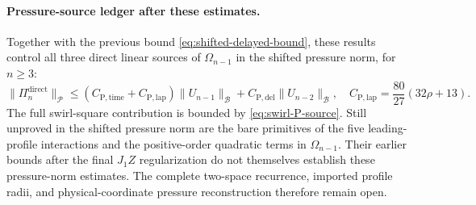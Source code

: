 \paragraph{Pressure-source ledger after these estimates.}
Together with the previous bound
\eqref{eq:shifted-delayed-bound}, these results control
all three direct linear sources of $\Omega_{n-1}$
in the shifted pressure norm, for $n\ge3$:
\begin{equation}\label{eq:direct-pressure-P-bound}
\|\Pi_n^{\mathrm{direct}}\|_{\mathcal P}
\le(C_{\mathrm{P,time}}+C_{\mathrm{P,lap}})
\|U_{n-1}\|_{\mathcal B}
+C_{\mathrm{P,del}}\|U_{n-2}\|_{\mathcal B},
\quad C_{\mathrm{P,lap}}=\frac{80}{27}(32\rho+13).
\end{equation}
The full swirl-square contribution is bounded by
\eqref{eq:swirl-P-source}. Still unproved in the shifted
pressure norm are the bare primitives of the five leading-profile
interactions and the positive-order quadratic terms in
$\Omega_{n-1}$. Their earlier bounds after the final
$J_1Z$ regularization do not themselves establish these
pressure-norm estimates. The complete two-space recurrence,
imported profile radii, and physical-coordinate pressure
reconstruction therefore remain open.


